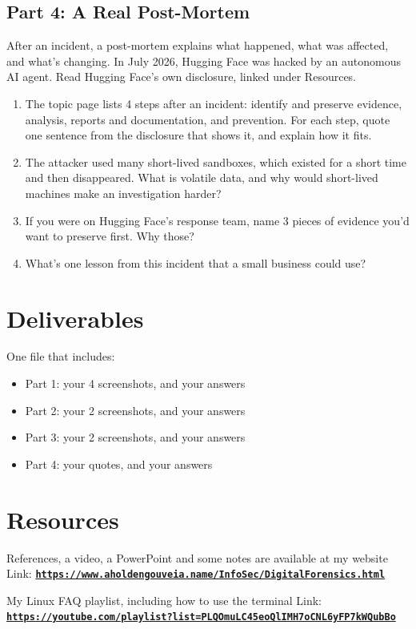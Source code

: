 \documentclass[12pt]{article}
\begin{document}
\subsection*{Part 4: A Real Post-Mortem}
After an incident, a post-mortem explains what happened, what was affected, and what's changing. In July 2026, Hugging Face was hacked by an autonomous AI agent. Read Hugging Face's own disclosure, linked under Resources.
\begin{enumerate}[start=14]
    \item The topic page lists 4 steps after an incident: identify and preserve evidence, analysis, reports and documentation, and prevention. For each step, quote one sentence from the disclosure that shows it, and explain how it fits.
    \item The attacker used many short-lived sandboxes, which existed for a short time and then disappeared. What is volatile data, and why would short-lived machines make an investigation harder?
    \item If you were on Hugging Face's response team, name 3 pieces of evidence you'd want to preserve first. Why those?
    \item What's one lesson from this incident that a small business could use?
\end{enumerate}

\section*{Deliverables}
One file that includes:
\begin{itemize}
    \item Part 1: your 4 screenshots, and your answers
    \item Part 2: your 2 screenshots, and your answers
    \item Part 3: your 2 screenshots, and your answers
    \item Part 4: your quotes, and your answers
\end{itemize}

\section*{Resources}
References, a video, a PowerPoint and some notes are available at my website
Link: \href{https://www.aholdengouveia.name/InfoSec/DigitalForensics.html}{\textbf{\nolinkurl{https://www.aholdengouveia.name/InfoSec/DigitalForensics.html}}}

My Linux FAQ playlist, including how to use the terminal
Link: \href{https://youtube.com/playlist?list=PLQOmuLC45eoQlIMH7oCNL6yFP7kWQubBo}{\textbf{\nolinkurl{https://youtube.com/playlist?list=PLQOmuLC45eoQlIMH7oCNL6yFP7kWQubBo}}}
\end{document}
